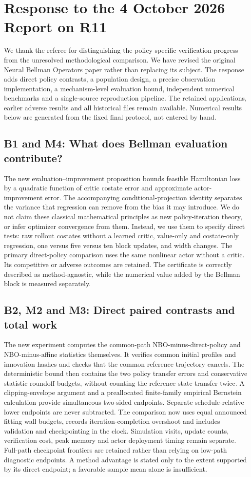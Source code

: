 \section*{Response to the 4 October 2026 Report on R11}
We thank the referee for distinguishing the policy-specific verification progress from the unresolved methodological comparison. We have revised the original Neural Bellman Operators paper rather than replacing its subject. The response adds direct policy contrasts, a population design, a precise observation implementation, a mechanism-level evaluation bound, independent numerical benchmarks and a single-source reproduction pipeline. The retained applications, earlier adverse results and all historical files remain available. Numerical results below are generated from the fixed final protocol, not entered by hand.

\subsection*{B1 and M4: What does Bellman evaluation contribute?}
The new evaluation--improvement proposition bounds feasible Hamiltonian loss by a quadratic function of critic costate error and approximate actor-improvement error. The accompanying conditional-projection identity separates the variance that regression can remove from the bias it may introduce. We do not claim these classical mathematical principles as new policy-iteration theory, or infer optimizer convergence from them. Instead, we use them to specify direct tests: raw rollout costates without a learned critic, value-only and costate-only regression, one versus five versus ten block updates, and width changes. The primary direct-policy comparison uses the same nonlinear actor without a critic. Its competitive or adverse outcomes are retained. The certificate is correctly described as method-agnostic, while the numerical value added by the Bellman block is measured separately.

\subsection*{B2, M2 and M3: Direct paired contrasts and total work}
The new experiment computes the common-path NBO-minus-direct-policy and NBO-minus-affine statistics themselves. It verifies common initial profiles and innovation hashes and checks that the common reference trajectory cancels. The deterministic bound then contains the two policy transfer errors and conservative statistic-roundoff budgets, without counting the reference-state transfer twice. A clipping-envelope argument and a preallocated finite-family empirical Bernstein calculation provide simultaneous two-sided endpoints. Separate schedule-relative lower endpoints are never subtracted. The comparison now uses equal announced fitting wall budgets, records iteration-completion overshoot and includes validation and checkpointing in the clock. Simulation visits, update counts, verification cost, peak memory and actor deployment timing remain separate. Full-path checkpoint frontiers are retained rather than relying on low-path diagnostic endpoints. A method advantage is stated only to the extent supported by its direct endpoint; a favorable sample mean alone is insufficient.

